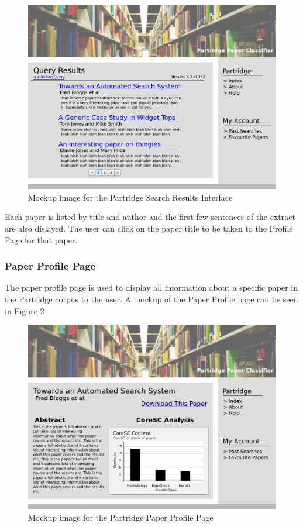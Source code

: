 \begin{figure}[!htb]
\vspace{5mm}
\centering
\includegraphics[width=\textwidth]{images/design/results_mockup.png}
\caption{Mockup image for the Partridge Search Results Interface}
\label{fig:results_mockup}
\end{figure}

Each paper is listed by title and author and the first few sentences of the
extract are also dislayed. The user can click on the paper title to be taken to
the Profile Page for that paper.


\subsubsection{ Paper Profile Page }

The paper profile page is used to display all information about a specific
paper in the Partridge corpus to the user. A mockup of the Paper Profile page
can be seen in Figure \ref{fig:paper_profile}

\begin{figure}[!htb]
\vspace{5mm}
\centering
\includegraphics[width=\textwidth]{images/design/profile_mockup.png}
\caption{Mockup image for the Partridge Paper Profile Page}
\label{fig:paper_profile}
\end{figure}

